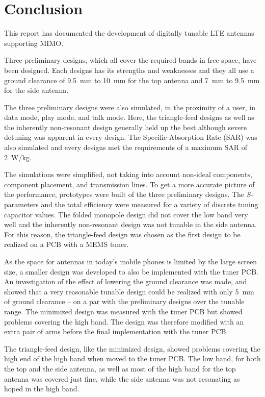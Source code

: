 \chapter{Conclusion}
\label{cha:conclusion}
This report has documented the development of digitally tunable LTE antennas supporting MIMO. 

Three preliminary designs, which all cover the required bands in free space, have been designed. Each designs has its strengths and weaknesses and they all use a ground clearance of \SI{9.5}{mm} to \SI{10}{mm} for the top antenna and \SI{7}{mm} to \SI{9.5}{mm} for the side antenna. 

The three preliminary designs were also simulated, in the proximity of a user, in data mode, play mode, and talk mode. Here, the triangle-feed designs as well as the inherently non-resonant design generally held up the best although severe detuning was apparent in every design. The Specific Absorption Rate (SAR) was also simulated and every designs met the requirements of a maximum SAR of \SI{2}{W/kg}.

The simulations were simplified, not taking into account non-ideal components, component placement, and transmission lines. To get a more accurate picture of the performance, prototypes were built of the three preliminary designs. The $S$-parameters and the total efficiency were measured for a variety of discrete tuning capacitor values. The folded monopole design did not cover the low band very well and the inherently non-resonant design was not tunable in the side antenna. For this reason, the triangle-feed design was chosen as the first design to be realized on a PCB with a MEMS tuner.

As the space for antennas in today's mobile phones is limited by the large screen size, a smaller design was developed to also be implemented with the tuner PCB. An investigation of the effect of lowering the ground clearance was made, and showed that a very reasonable tunable design could be realized with only \SI{5}{mm} of ground clearance -- on a par with the preliminary designs over the tunable range. The minimized design was measured with the tuner PCB but showed problems covering the high band. The design was therefore modified with an extra pair of arms before the final implementation with the tuner PCB.

The triangle-feed design, like the minimized design, showed problems covering the high end of the high band when moved to the tuner PCB. The low band, for both the top and the side antenna, as well as most of the high band for the top antenna was covered just fine, while the side antenna was not resonating as hoped in the high band.

